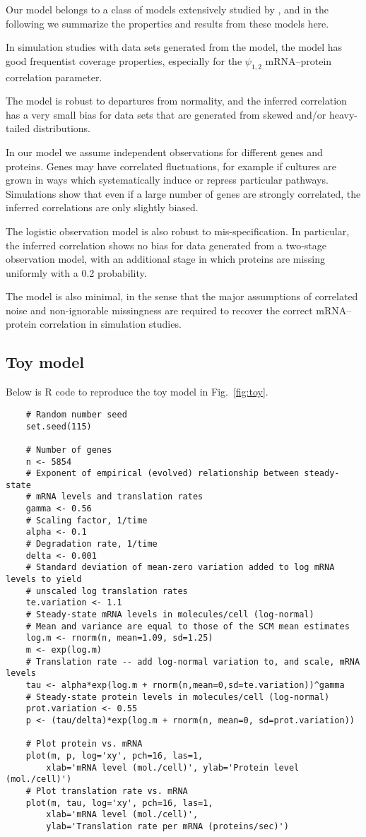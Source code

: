 \documentclass[10pt]{article}
\begin{document}
Our model belongs to a class of models extensively studied by
\cite{Franks2014}, and in the following we summarize the properties and results from
these models here.

In simulation studies with data sets generated from the model, the model
has good frequentist coverage properties, especially for
the $\psi_{1,2}$ mRNA--protein correlation parameter.

The model is robust to departures from normality, and the inferred
correlation has a very small bias for data sets that are generated
from skewed and/or heavy-tailed distributions.

In our model we assume independent observations for different genes
and proteins. Genes may have correlated fluctuations, for example if 
cultures are grown in ways which systematically induce or repress
particular pathways. Simulations show that even if a large number of genes are strongly
correlated, the inferred correlations are only slightly biased.

The logistic observation model is also robust to mis-specification.
In particular, the inferred correlation shows no bias for
data generated from a two-stage observation model,
with an additional stage in which proteins are missing uniformly
with a 0.2 probability. 

The model is also
minimal, in the sense that the major assumptions of correlated noise and
non-ignorable missingness are required to recover the correct
mRNA--protein correlation in simulation studies.

\subsection*{Toy model}
Below is R code to reproduce the toy model in Fig.~\ref{fig:toy}.
\begin{verbatim}
	# Random number seed
	set.seed(115)

	# Number of genes
	n <- 5854
	# Exponent of empirical (evolved) relationship between steady-state
	# mRNA levels and translation rates
	gamma <- 0.56
	# Scaling factor, 1/time
	alpha <- 0.1
	# Degradation rate, 1/time
	delta <- 0.001
	# Standard deviation of mean-zero variation added to log mRNA levels to yield
	# unscaled log translation rates
	te.variation <- 1.1
	# Steady-state mRNA levels in molecules/cell (log-normal)
	# Mean and variance are equal to those of the SCM mean estimates
	log.m <- rnorm(n, mean=1.09, sd=1.25)
	m <- exp(log.m)
	# Translation rate -- add log-normal variation to, and scale, mRNA levels
	tau <- alpha*exp(log.m + rnorm(n,mean=0,sd=te.variation))^gamma
	# Steady-state protein levels in molecules/cell (log-normal)
	prot.variation <- 0.55
	p <- (tau/delta)*exp(log.m + rnorm(n, mean=0, sd=prot.variation))

	# Plot protein vs. mRNA
	plot(m, p, log='xy', pch=16, las=1, 
		xlab='mRNA level (mol./cell)', ylab='Protein level (mol./cell)')
	# Plot translation rate vs. mRNA
	plot(m, tau, log='xy', pch=16, las=1,
		xlab='mRNA level (mol./cell)', 
		ylab='Translation rate per mRNA (proteins/sec)')
\end{verbatim}
\end{document}
